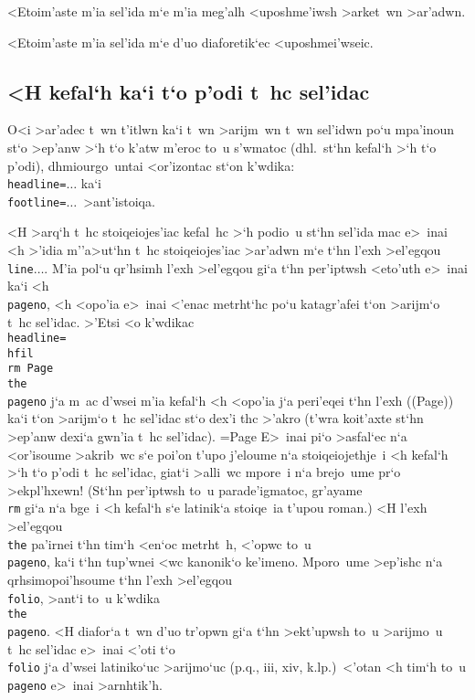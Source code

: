 \exercise <Etoim'aste m'ia sel'ida m`e m'ia meg'alh <uposhme'iwsh
>arket~wn >ar'adwn.

\exercise <Etoim'aste m'ia sel'ida m`e d'uo diaforetik`ec
<uposhmei'wseic.


\subsection{<H kefal`h ka`i t`o p'odi t~hc sel'idac}

O<i >ar'adec t~wn t'itlwn ka`i t~wn >arijm~wn t~wn sel'idwn po`u
mpa'inoun st`o >ep'anw >`h t`o k'atw m'eroc  to~u s'wmatoc (dhl.\ st`hn
kefal`h >`h t`o p'odi), dhmiourgo~untai <or'izontac st`on k'wdika: {\tt
\\headline=\lb$\dots$\rb} ka`i {\tt \\footline=\lb$\dots$\rb}\
>ant'istoiqa.%
           
<H >arq`h t~hc stoiqeiojes'iac kefal~hc >`h podio~u st`hn sel'ida mac
e>~inai <h >'idia m''\NB a>ut`hn t~hc stoiqeiojes'iac >ar'adwn m`e t`hn
l'exh >el'egqou {\tt \\line\lb $\dots$\rb}\null. M'ia pol`u qr'hsimh
l'exh >el'egqou gi`a t`hn per'iptwsh <eto'uth e>~inai ka`i <h {\tt
\\pageno}, <h <opo'ia e>~inai <'enac metrht`hc po`u katagr'afei t`on
>arijm`o t~hc sel'idac.  >'Etsi <o k'wdikac {\tt \\headline=\lb\\hfil
\\rm Page \\the\\pageno\rb} j`a m~ac d'wsei m'ia kefal`h <h <opo'ia
j`a peri'eqei t`hn l'exh (({\rm Page})) ka`i t`on >arijm`o t~hc sel'idac
st`o dex'i thc >'akro (t'wra koit'axte st`hn >ep'anw dexi`a gwn'ia t~hc
sel'idac).  
%
\headline={\hfil \rm Page \the\pageno} %
%
E>~inai pi`o >asfal`ec n`a <or'isoume >akri\-b~wc s`e poi'on t'upo
j'eloume n`a stoiqeiojethje~i <h kefal`h >`h t`o p'odi t~hc sel'idac,
giat`i >alli~wc mpore~i n`a brejo~ume pr`o >ekpl'hxewn! (St`hn
per'iptwsh to~u parade'igmatoc, gr'ayame {\tt \\rm} gi`a n`a bge~i <h
kefal`h s`e latinik`a stoiqe~ia t'upou {\rm roman}.) <H l'exh >el'egqou
{\tt \\the} pa'irnei t`hn tim`h <en`oc metrht~h, <'opwc to~u {\tt
\\pageno}, ka`i t`hn tup'wnei <wc kanonik`o ke'imeno. Mporo~ume >ep'ishc
n`a qrhsimopoi'hsoume t`hn l'exh >el'egqou {\tt \\folio}, >ant`i to~u
k'wdika {\tt \\the \\pageno}. <H diafor`a t~wn d'uo tr'opwn gi`a t`hn
>ekt'upwsh to~u >arijmo~u t~hc sel'idac e>~inai <'oti t`o {\tt \\folio}
j`a d'wsei latiniko`uc >arijmo`uc (p.q., {\rm iii}, {\rm xiv}, k.lp.)\
<'otan <h tim`h to~u {\tt \\pageno} e>~inai >arnhtik'h.
\toindex{headline}
\toindex{footline}

